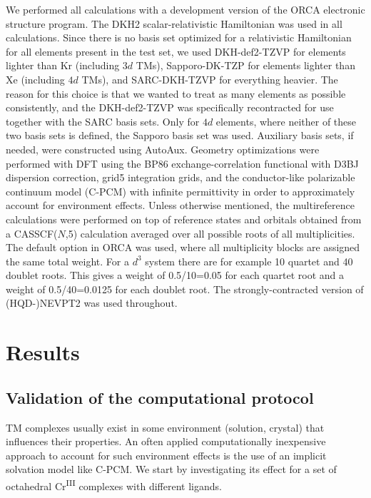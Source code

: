We performed all calculations with a development version of the ORCA electronic structure program.\cite{Neese_2018_1327} The DKH2 scalar-relativistic Hamiltonian\cite{Hess_1986_3742, JanseH_1989_6016} was used in all calculations. Since there is no basis set optimized for a relativistic Hamiltonian for all elements present in the test set, we used DKH-def2-TZVP\cite{PantaCLN_2008_908} for elements lighter than Kr (including $3d$ TMs), Sapporo-DK-TZP\cite{NoroSK_2012_1124} for elements lighter than Xe (including $4d$ TMs), and SARC-DKH-TZVP\cite{PantaCLN_2008_908, PantaN_2009_2229, PantaN_2011_677, PantaN_2012_1292} for everything heavier. The reason for this choice is that we wanted to treat as many elements as possible consistently, and the DKH-def2-TZVP was specifically recontracted for use together with the SARC basis sets.\cite{PantaCLN_2008_908} Only for $4d$ elements, where neither of these two basis sets is defined, the Sapporo basis set was used. Auxiliary basis sets, if needed, were constructed using AutoAux.\cite{StoycAN_2017_554} Geometry optimizations were performed with DFT using the BP86\cite{Perde_1986_8822}\cite{Becke_1988_3098} exchange-correlation functional with D3BJ\cite{GrimmAEK_2010_154104, GrimmEG_2011_1456} dispersion correction, grid5 integration grids, and the conductor-like polarizable continuum model (C-PCM)\cite{BaronC_1998_1995} with infinite permittivity in order to approximately account for environment effects. Unless otherwise mentioned, the multireference calculations were performed on top of reference states and orbitals obtained from a CASSCF($N$,5) calculation averaged over all possible roots of all multiplicities.  The default option in ORCA was used, where all multiplicity blocks are assigned the same total weight. For a $d^3$ system there are for example 10 quartet and 40 doublet roots. This gives a weight of 0.5/10=0.05 for each quartet root and a weight of 0.5/40=0.0125 for each doublet root. The strongly-contracted\cite{AngelCM_2001_297, AngelCM_2002_9138} version of (HQD-)NEVPT2 was used throughout.

\section{Results}
\subsection{Validation of the computational protocol}
TM complexes usually exist in some environment (solution, crystal) that influences their properties. An often applied computationally inexpensive approach to account for such environment effects is the use of an implicit solvation model like C-PCM.\cite{BaronC_1998_1995} We start by investigating its effect for a set of octahedral Cr\textsuperscript{III} complexes with different ligands.

